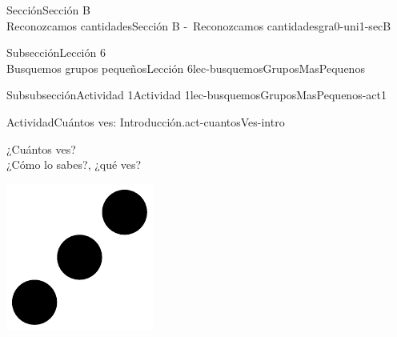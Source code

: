 \begin{sectionptx}{Sección}{{\Large Sección B\\}Reconozcamos cantidades}{}{Sección B -~Reconozcamos cantidades}{}{}{gra0-uni1-secB}
\begin{subsectionptx}{Subsección}{{\normalsize Lección 6\\[-0.05cm]}Busquemos grupos pequeños}{}{Lección 6}{}{}{lec-busquemosGruposMasPequenos}
\typeout{************************************************}
%
\begin{subsubsectionptx}{Subsubsección}{Actividad 1}{}{Actividad 1}{}{}{lec-busquemosGruposMasPequenos-act1}
\begin{activity}{Actividad}{Cuántos ves: Introducción.}{act-cuantosVes-intro}%
\begin{minipage}{0.6\linewidth}
¿Cuántos ves?\\
 ¿Cómo lo sabes?, ¿qué ves?%
\end{minipage}
\hfill
\begin{minipage}{0.3\linewidth}
\begin{image}{0}{1}{0}{}%
\includegraphics[max width=\linewidth, center]{external/svg-source/tikz-file-148150.pdf}
\end{image}%
\end{minipage}
\end{activity}%
\end{subsubsectionptx}
%
%
\typeout{************************************************}
\typeout{************************************************}
%

\end{subsectionptx}
\end{sectionptx}
